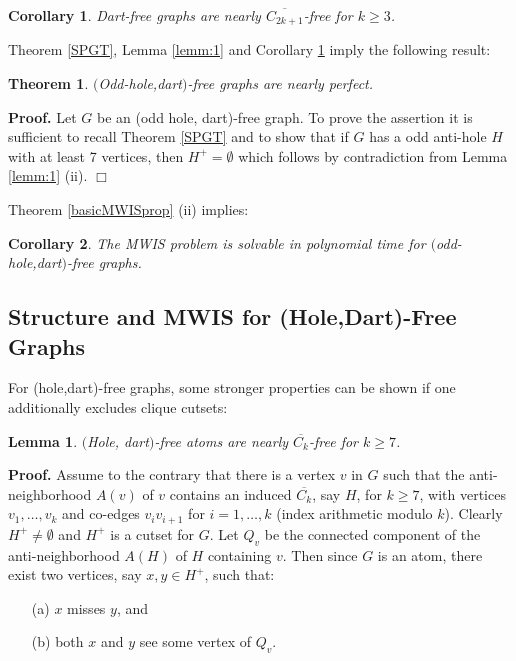 \documentclass[11pt]{article}
\newcommand{\qed}{\hfill $\Box$}
\newcommand{\0}{\text{ has a co-join to }}
\newcommand{\1}{\text{ has a join to }}
\newtheorem{theo}{Theorem}
\newtheorem{lemm}{Lemma}
\newtheorem{coro}{Corollary}
\begin{document}
\medskip

\begin{coro}\label{dartfreenearlycoC7free}
Dart-free graphs are nearly $\overline{C_{2k+1}}$-free for $k \ge 3$.
\end{coro}

Theorem \ref{SPGT}, Lemma \ref{lemm:1} and Corollary \ref{dartfreenearlycoC7free} imply the following result:

\begin{theo}
$($Odd-hole,dart$)$-free graphs are nearly perfect.
\end{theo}

\noindent
{\bf Proof.} Let $G$ be an (odd hole, dart)-free graph. To prove the assertion it is sufficient to recall Theorem \ref{SPGT} and to 
show that if $G$ has a odd anti-hole $H$ with at least 7 vertices, then $H^+ = \emptyset$ which follows by contradiction from Lemma \ref{lemm:1} (ii).  
\qed

\medskip

Theorem \ref{basicMWISprop} (ii) implies:

\begin{coro}
The MWIS problem is solvable in polynomial time for $($odd-hole,dart$)$-free graphs.
\end{coro}

\subsection{Structure and MWIS for (Hole,Dart)-Free Graphs}

For (hole,dart)-free graphs, some stronger properties can be shown if one additionally excludes clique cutsets: 

\begin{lemm}\label{lemm:co-c7}
$($Hole, dart$)$-free atoms are nearly $\overline{C_k}$-free for $k \geq 7$.
\end{lemm}

\noindent
{\bf Proof.} Assume to the contrary that there is a vertex $v$ in $G$ such that the anti-neighborhood $A(v)$ of $v$ contains an induced $\overline{C_k}$, say $H$, for $k \geq 7$, with vertices $v_1,\ldots,v_k$ and co-edges $v_iv_{i+1}$ for $i = 1,\ldots,k$ (index arithmetic modulo $k$). Clearly $H^+ \neq \emptyset$ and $H^+$ is a cutset for $G$. Let $Q_v$ be the connected component of the anti-neighborhood $A(H)$ of $H$ containing $v$. Then since $G$ is an atom, there exist two vertices, say $x,y \in H^+$, such that: 
\begin{itemize}
\item[(a)] $x$ misses $y$, and 
\item[(b)] both $x$ and $y$ see some vertex of $Q_v$. 
\end{itemize}
\end{document}
